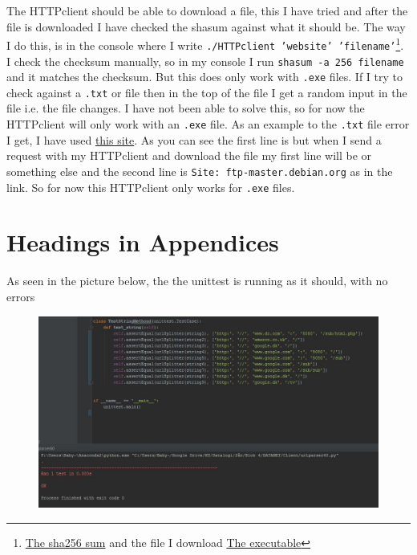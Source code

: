 \documentclass{sig-alternate-05-2015}
\begin{document}
The HTTPclient should be able to download a file, this I have tried and after the file is downloaded I have checked the shasum against what it should be.
The way I do this, is in the console where I write \texttt{./HTTPclient 'website' 'filename'}\footnote{\href{https://download.jetbrains.com/python/pycharm-community-2016.1.3.exe.sha256}{The sha256 sum} and the file I download \href{http://download.jetbrains.com/python/pycharm-community-2016.1.3.exe}{The executable}}. I check the checksum manually, so in my console I run \texttt{shasum -a 256 filename} and it matches the checksum.
But this does only work with \texttt{.exe} files. If I try to check against a \texttt{.txt} or  file then in the top of the file I get a random input in the file i.e. the file changes. I have not been able to solve this, so for now the HTTPclient will only work with an \texttt{.exe} file. As an example to the \texttt{.txt} file error I get, I have used \href{http://anonscm.debian.org/viewvc/webwml/webwml/english/mirror/Mirrors.masterlist?view=co}{this site}. As you can see the first line is  but when I send a request with my HTTPclient and download the file my first line will be  or something else and the second line is \texttt{Site: ftp-master.debian.org} as in the link. So for now this HTTPclient only works for \texttt{.exe} files.

\appendix
\section{Headings in Appendices}
As seen in the picture below, the the unittest is running as it should, with no errors
 
\newpage
\begin{figure}[H]
  \centering
  \includegraphics[scale=0.7]{unittestting.jpg}
\end{figure}


\end{document}
